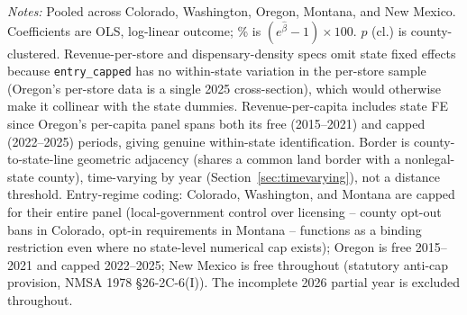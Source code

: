 \begin{table}[htbp]
\centering
\caption{Main pooled specification: border $\times$ entry-regime interaction}
\label{tab:main_pooled}
\footnotesize
{}
\begin{minipage}{0.98\textwidth}
\vspace{0.3em}
\footnotesize
\textit{Notes:} Pooled across Colorado, Washington, Oregon, Montana, and New Mexico. Coefficients are OLS,
log-linear outcome; \% is $(e^{\hat\beta}-1)\times 100$. $p$ (cl.) is county-clustered. Revenue-per-store and
dispensary-density specs omit state fixed effects because \texttt{entry\_capped} has no within-state variation
in the per-store sample (Oregon's per-store data is a single 2025 cross-section), which would otherwise make
it collinear with the state dummies. Revenue-per-capita includes state FE since Oregon's per-capita panel
spans both its free (2015--2021) and capped (2022--2025) periods, giving genuine within-state identification.
Border is county-to-state-line geometric adjacency (shares a common land border with a nonlegal-state county),
time-varying by year (Section~\ref{sec:timevarying}), not a distance threshold. Entry-regime coding: Colorado,
Washington, and Montana are capped for their entire panel (local-government control over licensing -- county
opt-out bans in Colorado, opt-in requirements in Montana -- functions as a binding restriction even where no
state-level numerical cap exists); Oregon is free 2015--2021 and capped 2022--2025; New Mexico is free
throughout (statutory anti-cap provision, NMSA 1978 \S 26-2C-6(I)). The incomplete 2026 partial year is
excluded throughout.
\end{minipage}
\end{table}
